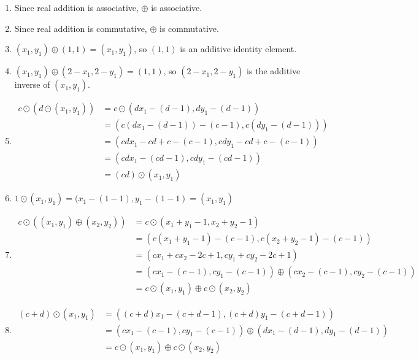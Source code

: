 \documentclass{sbgLAquiz}
\begin{document}
\begin{solution}
\begin{enumerate}[1)]
\item Since real addition is associative, $\oplus$ is associative.
\item Since real addition is commutative, $\oplus$ is commutative.
\item $(x_1,y_1) \oplus (1,1) = (x_1,y_1)$, so $(1,1)$ is an additive identity element.
\item $(x_1,y_1) \oplus (2-x_1,2-y_1) = (1,1)$, so $(2-x_1,2-y_1)$ is the additive inverse of $(x_1,y_1)$.
\item \begin{align*} c\odot \left(d \odot (x_1,y_1) \right) &=c\odot \left( dx_1-(d-1),dy_1-(d-1)\right) \\ 
&= \left( c\left(dx_1-(d-1) \right)-(c-1), c\left(dy_1-(d-1) \right) \right) \\
&= \left(cdx_1-cd+c-(c-1), cdy_1-cd+c-(c-1) \right) \\
&= \left(cdx_1-(cd-1), cdy_1-(cd-1) \right) \\
&= (cd) \odot (x_1,y_1)
\end{align*}
\item $1 \odot (x_1,y_1) = (x_1-(1-1),y_1-(1-1)=(x_1,y_1)$
\item \begin{align*} c \odot \left( (x_1,y_1)\oplus(x_2,y_2) \right) &= 
c\odot \left( x_1+y_1-1,x_2+y_2-1 \right) \\
&= \left( c(x_1+y_1-1)-(c-1), c(x_2+y_2-1)-(c-1) \right) \\
&= (cx_1+cx_2-2c+1, cy_1+cy_2-2c+1) \\
&= \left(cx_1-(c-1),cy_1-(c-1) \right) \oplus (cx_2-(c-1),cy_2-(c-1)) \\
&=c \odot (x_1,y_1) \oplus c\odot (x_2,y_2) 
\end{align*}
\item \begin{align*} (c+d) \odot (x_1,y_1) &=
\left( (c+d)x_1-(c+d-1), (c+d)y_1-(c+d-1) \right) \\
&= \left( cx_1-(c-1), cy_1-(c-1) \right) \oplus (dx_1-(d-1), dy_1-(d-1) ) \\
&= c\odot (x_1,y_1) \oplus c \odot (x_2,y_2)
\end{align*}
\end{enumerate}
\end{solution}
\end{document}
